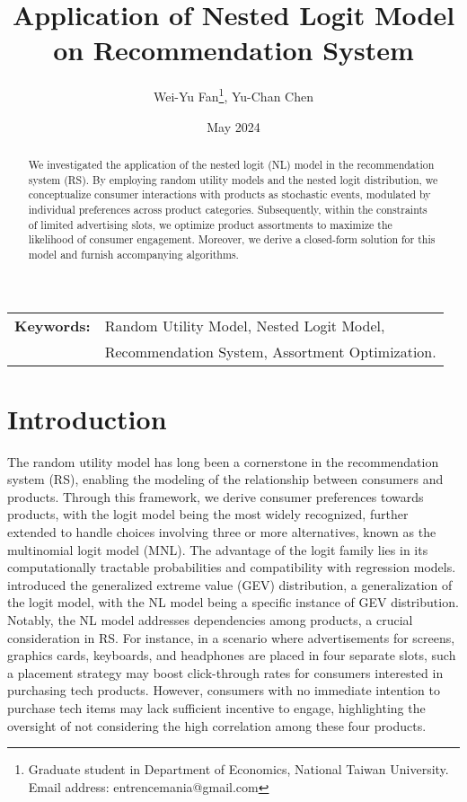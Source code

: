 \documentclass[12pt]{article}
\title{Application of Nested Logit Model on Recommendation System}
\author{Wei-Yu Fan\thanks{
Graduate student in Department of Economics, National Taiwan University.\\ 
Email address: entrencemania@gmail.com
}, Yu-Chan Chen
}
\date{May 2024}
\theoremstyle{definition}
\begin{document}
\maketitle
\begin{sloppypar}
\begin{spacing}{0}
\begin{abstract}
\noindent 
We investigated the application of the nested logit (NL) model in the recommendation system (RS). By employing random utility models and the nested logit distribution, we conceptualize consumer interactions with products as stochastic events, modulated by individual preferences across product categories. Subsequently, within the constraints of limited advertising slots, we optimize product assortments to maximize the likelihood of consumer engagement. Moreover, we derive a closed-form solution for this model and furnish accompanying algorithms.
\end{abstract}
\end{spacing}
\begin{tabular}{rl}
\\
\textbf{Keywords:} &Random Utility Model, Nested Logit Model, \\
&Recommendation System, Assortment Optimization.\\
\end{tabular}

\newpage
\section{Introduction}
The random utility model has long been a cornerstone in the recommendation system (RS), enabling the modeling of the relationship between consumers and products. Through this framework, we derive consumer preferences towards products, with the logit model being the most widely recognized, further extended to handle choices involving three or more alternatives, known as the multinomial logit model (MNL). The advantage of the logit family lies in its computationally tractable probabilities and compatibility with regression models. \textcite{mcfadden1977} introduced the generalized extreme value (GEV) distribution, a generalization of the logit model, with the NL model being a specific instance of GEV distribution. Notably, the NL model addresses dependencies among products, a crucial consideration in RS. For instance, in a scenario where advertisements for screens, graphics cards, keyboards, and headphones are placed in four separate slots, such a placement strategy may boost click-through rates for consumers interested in purchasing tech products. However, consumers with no immediate intention to purchase tech items may lack sufficient incentive to engage, highlighting the oversight of not considering the high correlation among these four products.


\end{sloppypar}
\end{document}
